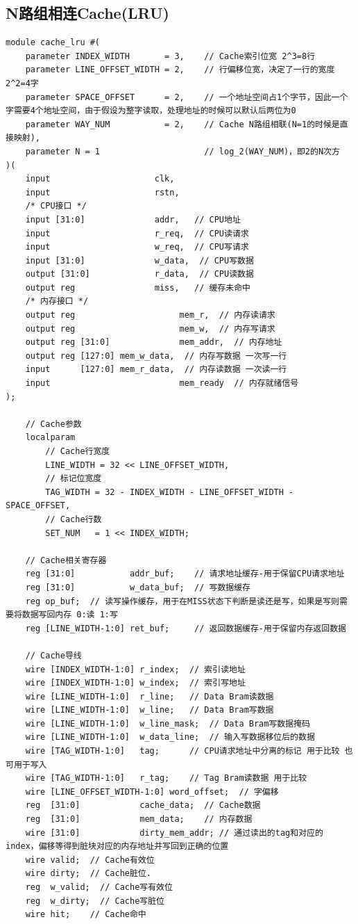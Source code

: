 \documentclass[12pt,a4paper]{ctexart}
\begin{document}
\subsection{N路组相连Cache(LRU)}
\begin{lstlisting}[style=verilog]
module cache_lru #(
    parameter INDEX_WIDTH       = 3,    // Cache索引位宽 2^3=8行
    parameter LINE_OFFSET_WIDTH = 2,    // 行偏移位宽，决定了一行的宽度 2^2=4字
    parameter SPACE_OFFSET      = 2,    // 一个地址空间占1个字节，因此一个字需要4个地址空间，由于假设为整字读取，处理地址的时候可以默认后两位为0
    parameter WAY_NUM           = 2,    // Cache N路组相联(N=1的时候是直接映射),
    parameter N = 1                     // log_2(WAY_NUM)，即2的N次方
)(
    input                     clk,    
    input                     rstn,
    /* CPU接口 */  
    input [31:0]              addr,   // CPU地址
    input                     r_req,  // CPU读请求
    input                     w_req,  // CPU写请求
    input [31:0]              w_data,  // CPU写数据
    output [31:0]             r_data,  // CPU读数据
    output reg                miss,   // 缓存未命中
    /* 内存接口 */  
    output reg                     mem_r,  // 内存读请求
    output reg                     mem_w,  // 内存写请求
    output reg [31:0]              mem_addr,  // 内存地址
    output reg [127:0] mem_w_data,  // 内存写数据 一次写一行
    input      [127:0] mem_r_data,  // 内存读数据 一次读一行
    input                          mem_ready  // 内存就绪信号
);

    // Cache参数
    localparam
        // Cache行宽度
        LINE_WIDTH = 32 << LINE_OFFSET_WIDTH,
        // 标记位宽度
        TAG_WIDTH = 32 - INDEX_WIDTH - LINE_OFFSET_WIDTH - SPACE_OFFSET,
        // Cache行数
        SET_NUM   = 1 << INDEX_WIDTH;
    
    // Cache相关寄存器
    reg [31:0]           addr_buf;    // 请求地址缓存-用于保留CPU请求地址
    reg [31:0]           w_data_buf;  // 写数据缓存
    reg op_buf;  // 读写操作缓存，用于在MISS状态下判断是读还是写，如果是写则需要将数据写回内存 0:读 1:写
    reg [LINE_WIDTH-1:0] ret_buf;     // 返回数据缓存-用于保留内存返回数据

    // Cache导线
    wire [INDEX_WIDTH-1:0] r_index;  // 索引读地址
    wire [INDEX_WIDTH-1:0] w_index;  // 索引写地址
    wire [LINE_WIDTH-1:0]  r_line;   // Data Bram读数据
    wire [LINE_WIDTH-1:0]  w_line;   // Data Bram写数据
    wire [LINE_WIDTH-1:0]  w_line_mask;  // Data Bram写数据掩码
    wire [LINE_WIDTH-1:0]  w_data_line;  // 输入写数据移位后的数据
    wire [TAG_WIDTH-1:0]   tag;      // CPU请求地址中分离的标记 用于比较 也可用于写入
    wire [TAG_WIDTH-1:0]   r_tag;    // Tag Bram读数据 用于比较
    wire [LINE_OFFSET_WIDTH-1:0] word_offset;  // 字偏移
    reg  [31:0]            cache_data;  // Cache数据
    reg  [31:0]            mem_data;    // 内存数据
    wire [31:0]            dirty_mem_addr; // 通过读出的tag和对应的index，偏移等得到脏块对应的内存地址并写回到正确的位置
    wire valid;  // Cache有效位
    wire dirty;  // Cache脏位.
    reg  w_valid;  // Cache写有效位
    reg  w_dirty;  // Cache写脏位
    wire hit;    // Cache命中


\end{lstlisting}
\end{document}
